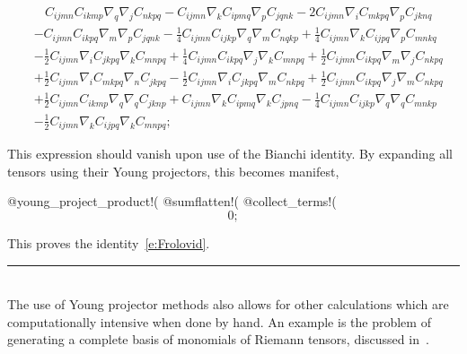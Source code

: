 \documentclass[11pt]{article}
\newenvironment{hanging}
    {\begin{list}{}{\setlength\itemsep{0pt}%
 \setlength\topsep{0pt}%
 \setlength\leftmargin{25pt}%
 \setlength\itemindent{0pt}%
 \setlength\listparindent{\itemindent}}%
     \item[]}
    {\end{list}}
\newcommand{\botrule}{\noindent\hspace{25pt}\rule{435pt}{.1pt}\\[2ex]}
\newenvironment{cdbcont}{\fvset{firstnumber=last}\color[named]{Blue}\Verbatim}{\endVerbatim}
\newenvironment{cdbout}{\vspace{-1ex}\begin{equation}}{\end{equation}\vspace{-1ex}}
\newenvironment{cdbcom}{\begin{hanging}}{\end{hanging}}
\begin{document}
\begin{cdbout}
\begin{aligned}
& ~~~~ C_{i j m n} C_{i k m p} \nabla_{q}{\nabla_{j}{C_{n k p q}}} 
- C_{i j m n} \nabla_{k}{C_{i p m q}} \nabla_{p}{C_{j q n k}} 
- 2 C_{i j m n} \nabla_{i}{C_{m k p q}} \nabla_{p}{C_{j k n q}} \\
&- C_{i j m n} C_{i k p q} \nabla_{m}{\nabla_{p}{C_{j q n k}}} 
- \frac{1}{4} C_{i j m n} C_{i j k p} \nabla_{q}{\nabla_{m}{C_{n q k p}}} 
+ \frac{1}{4} C_{i j m n} \nabla_{k}{C_{i j p q}} \nabla_{p}{C_{m n k q}} \\
&- \frac{1}{2} C_{i j m n} \nabla_{i}{C_{j k p q}} \nabla_{k}{C_{m n p q}} 
+ \frac{1}{4} C_{i j m n} C_{i k p q} \nabla_{j}{\nabla_{k}{C_{m n p q}}} 
+ \frac{1}{2} C_{i j m n} C_{i k p q} \nabla_{m}{\nabla_{j}{C_{n k p q}}} \\
&+ \frac{1}{2} C_{i j m n} \nabla_{i}{C_{m k p q}} \nabla_{n}{C_{j k p q}} 
- \frac{1}{2} C_{i j m n} \nabla_{i}{C_{j k p q}} \nabla_{m}{C_{n k p q}} 
+ \frac{1}{2} C_{i j m n} C_{i k p q} \nabla_{j}{\nabla_{m}{C_{n k p q}}}\\ 
&+ \frac{1}{2} C_{i j m n} C_{i k m p} \nabla_{q}{\nabla_{q}{C_{j k n p}}} 
+ C_{i j m n} \nabla_{k}{C_{i p m q}} \nabla_{k}{C_{j p n q}} 
- \frac{1}{4} C_{i j m n} C_{i j k p} \nabla_{q}{\nabla_{q}{C_{m n k p}}} \\
&- \frac{1}{2} C_{i j m n} \nabla_{k}{C_{i j p q}} \nabla_{k}{C_{m n p q}};
\end{aligned}
\end{cdbout}
\begin{cdbcom}
This expression should vanish upon use of the Bianchi identity. By
expanding all tensors using their Young projectors, this becomes manifest,
\end{cdbcom}
\begin{cdbcont}
@young_project_product!(%
@sumflatten!(%
@collect_terms!(%
\end{cdbcont}
\begin{cdbout}
0;
\end{cdbout}
\begin{cdbcom}
This proves the identity~\eqref{e:Frolovid}.
\end{cdbcom}
\botrule
The use of Young projector methods also allows for other calculations
which are computationally intensive when done by hand. An example is
the problem of generating a complete basis of monomials of Riemann
tensors, discussed in~\cite{Peeters:2006kp}. 

\end{document}
